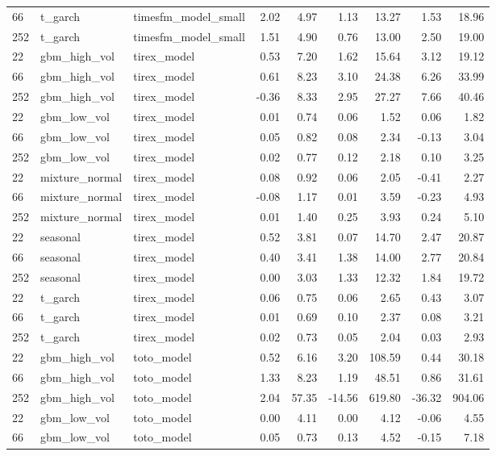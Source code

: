 {\begin{tabular}{lllrrrrrr}
66 & t\_garch & timesfm\_model\_small & 2.02 & 4.97 & 1.13 & 13.27 & 1.53 & 18.96 \\
252 & t\_garch & timesfm\_model\_small & 1.51 & 4.90 & 0.76 & 13.00 & 2.50 & 19.00 \\
\midrule
22 & gbm\_high\_vol & tirex\_model & 0.53 & 7.20 & 1.62 & 15.64 & 3.12 & 19.12 \\
66 & gbm\_high\_vol & tirex\_model & 0.61 & 8.23 & 3.10 & 24.38 & 6.26 & 33.99 \\
252 & gbm\_high\_vol & tirex\_model & -0.36 & 8.33 & 2.95 & 27.27 & 7.66 & 40.46 \\
\midrule
22 & gbm\_low\_vol & tirex\_model & 0.01 & 0.74 & 0.06 & 1.52 & 0.06 & 1.82 \\
66 & gbm\_low\_vol & tirex\_model & 0.05 & 0.82 & 0.08 & 2.34 & -0.13 & 3.04 \\
252 & gbm\_low\_vol & tirex\_model & 0.02 & 0.77 & 0.12 & 2.18 & 0.10 & 3.25 \\
\midrule
22 & mixture\_normal & tirex\_model & 0.08 & 0.92 & 0.06 & 2.05 & -0.41 & 2.27 \\
66 & mixture\_normal & tirex\_model & -0.08 & 1.17 & 0.01 & 3.59 & -0.23 & 4.93 \\
252 & mixture\_normal & tirex\_model & 0.01 & 1.40 & 0.25 & 3.93 & 0.24 & 5.10 \\
\midrule
22 & seasonal & tirex\_model & 0.52 & 3.81 & 0.07 & 14.70 & 2.47 & 20.87 \\
66 & seasonal & tirex\_model & 0.40 & 3.41 & 1.38 & 14.00 & 2.77 & 20.84 \\
252 & seasonal & tirex\_model & 0.00 & 3.03 & 1.33 & 12.32 & 1.84 & 19.72 \\
\midrule
22 & t\_garch & tirex\_model & 0.06 & 0.75 & 0.06 & 2.65 & 0.43 & 3.07 \\
66 & t\_garch & tirex\_model & 0.01 & 0.69 & 0.10 & 2.37 & 0.08 & 3.21 \\
252 & t\_garch & tirex\_model & 0.02 & 0.73 & 0.05 & 2.04 & 0.03 & 2.93 \\
\midrule
22 & gbm\_high\_vol & toto\_model & 0.52 & 6.16 & 3.20 & 108.59 & 0.44 & 30.18 \\
66 & gbm\_high\_vol & toto\_model & 1.33 & 8.23 & 1.19 & 48.51 & 0.86 & 31.61 \\
252 & gbm\_high\_vol & toto\_model & 2.04 & 57.35 & -14.56 & 619.80 & -36.32 & 904.06 \\
\midrule
22 & gbm\_low\_vol & toto\_model & 0.00 & 4.11 & 0.00 & 4.12 & -0.06 & 4.55 \\
66 & gbm\_low\_vol & toto\_model & 0.05 & 0.73 & 0.13 & 4.52 & -0.15 & 7.18 \\

\end{tabular}}
